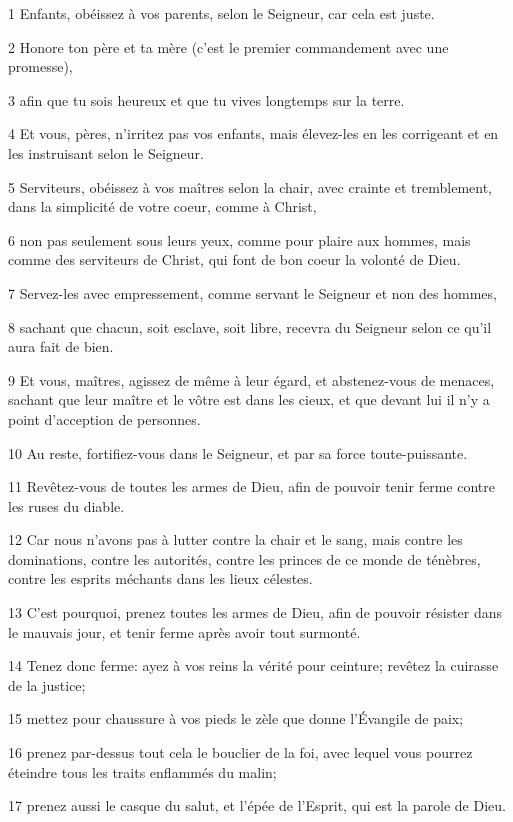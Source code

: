 \par 1 Enfants, obéissez à vos parents, selon le Seigneur, car cela est juste.
\par 2 Honore ton père et ta mère (c'est le premier commandement avec une promesse),
\par 3 afin que tu sois heureux et que tu vives longtemps sur la terre.
\par 4 Et vous, pères, n'irritez pas vos enfants, mais élevez-les en les corrigeant et en les instruisant selon le Seigneur.
\par 5 Serviteurs, obéissez à vos maîtres selon la chair, avec crainte et tremblement, dans la simplicité de votre coeur, comme à Christ,
\par 6 non pas seulement sous leurs yeux, comme pour plaire aux hommes, mais comme des serviteurs de Christ, qui font de bon coeur la volonté de Dieu.
\par 7 Servez-les avec empressement, comme servant le Seigneur et non des hommes,
\par 8 sachant que chacun, soit esclave, soit libre, recevra du Seigneur selon ce qu'il aura fait de bien.
\par 9 Et vous, maîtres, agissez de même à leur égard, et abstenez-vous de menaces, sachant que leur maître et le vôtre est dans les cieux, et que devant lui il n'y a point d'acception de personnes.
\par 10 Au reste, fortifiez-vous dans le Seigneur, et par sa force toute-puissante.
\par 11 Revêtez-vous de toutes les armes de Dieu, afin de pouvoir tenir ferme contre les ruses du diable.
\par 12 Car nous n'avons pas à lutter contre la chair et le sang, mais contre les dominations, contre les autorités, contre les princes de ce monde de ténèbres, contre les esprits méchants dans les lieux célestes.
\par 13 C'est pourquoi, prenez toutes les armes de Dieu, afin de pouvoir résister dans le mauvais jour, et tenir ferme après avoir tout surmonté.
\par 14 Tenez donc ferme: ayez à vos reins la vérité pour ceinture; revêtez la cuirasse de la justice;
\par 15 mettez pour chaussure à vos pieds le zèle que donne l'Évangile de paix;
\par 16 prenez par-dessus tout cela le bouclier de la foi, avec lequel vous pourrez éteindre tous les traits enflammés du malin;
\par 17 prenez aussi le casque du salut, et l'épée de l'Esprit, qui est la parole de Dieu.
